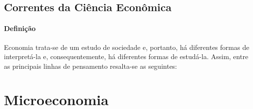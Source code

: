 \documentclass{article}
\begin{document}
        \subsection{Correntes da Ciência Econômica}
            \paragraph{Definição}Economia trata-se de um estudo de sociedade e, portanto, há diferentes formas de interpretá-la e, consequentemente, há diferentes formas de estudá-la. Assim, entre as principais linhas de pensamento resalta-se as seguintes:

    \section{Microeconomia}
\end{document}
